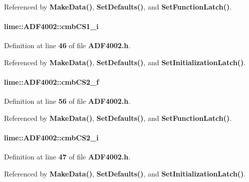 Referenced by {\bf Make\+Data()}, {\bf Set\+Defaults()}, and {\bf Set\+Function\+Latch()}.

\paragraph[{cmb\+C\+S1\+\_\+i}]{ lime\+::\+A\+D\+F4002\+::cmb\+C\+S1\+\_\+i}\label{classlime_1_1ADF4002_a4e7fd9be9685d02f17e4c865ef34570b}


Definition at line {\bf 46} of file {\bf A\+D\+F4002.\+h}.



Referenced by {\bf Make\+Data()}, {\bf Set\+Defaults()}, and {\bf Set\+Initialization\+Latch()}.

\paragraph[{cmb\+C\+S2\+\_\+f}]{ lime\+::\+A\+D\+F4002\+::cmb\+C\+S2\+\_\+f}\label{classlime_1_1ADF4002_ae0830b8e1edf0507ab76efabf97adff4}


Definition at line {\bf 56} of file {\bf A\+D\+F4002.\+h}.



Referenced by {\bf Make\+Data()}, {\bf Set\+Defaults()}, and {\bf Set\+Function\+Latch()}.

\paragraph[{cmb\+C\+S2\+\_\+i}]{ lime\+::\+A\+D\+F4002\+::cmb\+C\+S2\+\_\+i}\label{classlime_1_1ADF4002_a632e7165ec803110b119e75b5178a625}


Definition at line {\bf 47} of file {\bf A\+D\+F4002.\+h}.



Referenced by {\bf Make\+Data()}, {\bf Set\+Defaults()}, and {\bf Set\+Initialization\+Latch()}.

